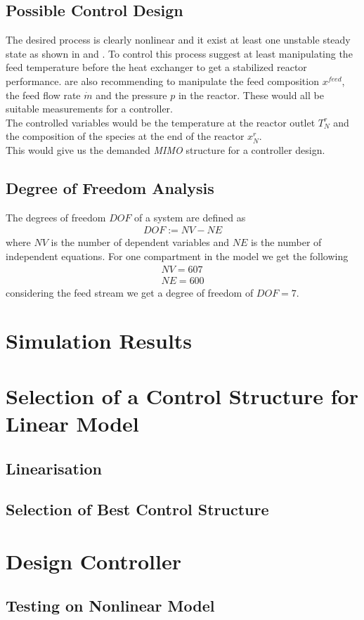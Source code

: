 \documentclass[paper=letter, fontsize=12pt]{article}
\begin{document}
\subsection{Possible Control Design}
The desired process is clearly nonlinear and it exist at least one unstable steady state as shown in \cite{Pattabathula2016} and \cite{Morud1998}. To control this process \cite{Pattabathula2016} suggest at least manipulating the feed temperature before the heat exchanger to get a stabilized reactor performance. \cite{Jinasena2016} are also recommending to manipulate the feed composition $x^{feed}$, the feed flow rate $\dot{m}$ and the pressure $p$ in the reactor. These would all be suitable measurements for a controller.\\
The controlled variables would be the temperature at the reactor outlet $T^r_N$ and the composition of the species at the end of the reactor $x^r_N$.\\
This would give us the demanded \emph{MIMO} structure for a controller design.
\subsection{Degree of Freedom Analysis}
The degrees of freedom $DOF$ of a system are defined as
\begin{align}
DOF:=NV-NE
\end{align}
where $NV$ is the number of dependent variables and $NE$ is the number of independent equations. For one compartment in the model we get the following
\begin{align*}
NV=607\\
NE=600
\end{align*}
considering the feed stream we get a degree of freedom of $DOF=7$.
\section{Simulation Results}





\section{Selection of a Control Structure for Linear Model}
\subsection{Linearisation}
\subsection{Selection of Best Control Structure}






\section{Design Controller}
\subsection{Testing on Nonlinear Model}










\end{document}
